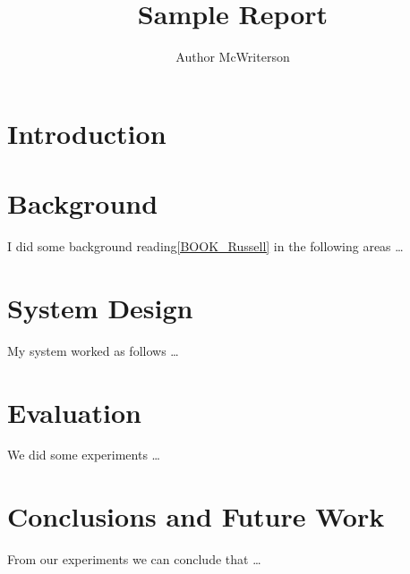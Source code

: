 \documentclass[a4paper, 11pt]{article}
\title{Sample Report}
\author{Author McWriterson}
\begin{document}
\maketitle
\tableofcontents

\section{Introduction}

\pagebreak

\section{Background}
I did some background reading\autoref{BOOK_Russell} in the following areas \ldots
\pagebreak

\section{System Design}
My system worked as follows \ldots
\pagebreak

\section{Evaluation}
We did some experiments \ldots
\pagebreak

\section{Conclusions and Future Work}

From our experiments we can conclude that \ldots

% 
% 


\end{document}
